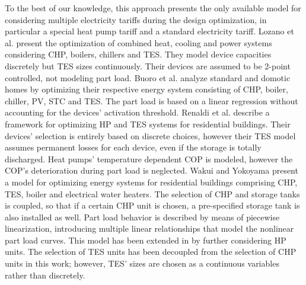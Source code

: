 To the best of our knowledge, this approach presents the only available model for considering multiple electricity tariffs during the design optimization, in particular a special heat pump tariff and a standard electricity tariff.
Lozano et al. \cite{Lozano2010} present the optimization of combined heat, cooling and power systems considering CHP, boilers, chillers and TES.
They model device capacities discretely but TES sizes continuously.
Their devices are assumed to be 2-point controlled, not modeling part load.
Buoro et al. \cite{Buoro2012} analyze standard and domotic homes by optimizing their respective energy system consisting of CHP, boiler, chiller, PV, STC and TES.
The part load is based on a linear regression without accounting for the devices' activation threshold.
Renaldi et al. \cite{Renaldi2016} describe a framework for optimizing HP and TES systems for residential buildings.
Their devices' selection is entirely based on discrete choices, however their TES model assumes permanent losses for each device, even if the storage is totally discharged.
Heat pumps' temperature dependent COP is modeled, however the COP's deterioration during part load is neglected.
Wakui and Yokoyama \cite{Wakui2014} present a model for optimizing energy systems for residential buildings comprising CHP, TES, boiler and electrical water heaters.
The selection of CHP and storage tanks is coupled, so that if a certain CHP unit is chosen, a pre-specified storage tank is also installed as well.
Part load behavior is described by means of piecewise linearization, introducing multiple linear relationships that model the nonlinear part load curves.
This model has been extended in \cite{Wakui2016} by further considering HP units.
The selection of TES units has been decoupled from the selection of CHP units in this work; however, TES' sizes are chosen as a continuous variables rather than discretely.

